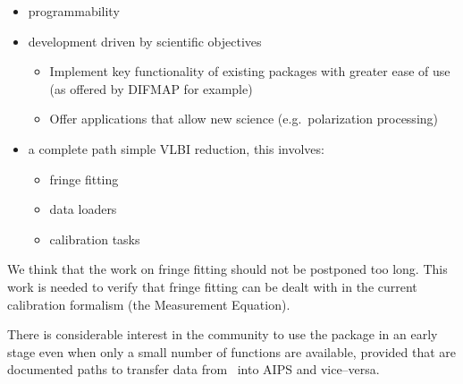 \begin{itemize}

\item programmability

\item development driven by scientific objectives

  \begin{itemize}
    
  \item Implement key functionality of existing packages with greater
    ease of use (as offered by DIFMAP for example)

  \item Offer applications that allow new science (e.g.\ polarization 
    processing)

  \end{itemize}

\item a complete path simple VLBI reduction, this involves:

  \begin{itemize}
  
  \item fringe fitting

  \item data loaders

  \item calibration tasks

  \end{itemize}

\end{itemize}

\noindent
We think that the work on fringe fitting should not be postponed too
long. This work is needed to verify that fringe fitting can be dealt
with in the current calibration formalism (the Measurement Equation).

There is considerable interest in the community to use the package in
an early stage even when only a small number of functions are
available, provided that are documented paths to transfer data from
\aipspp\ into AIPS and vice--versa.

%
